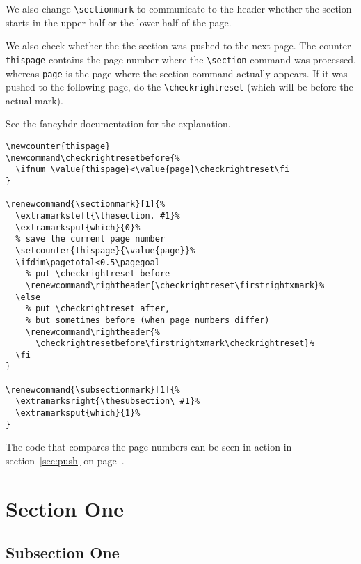 \documentclass{article}
\newcommand\rightheader{\firstrightxmark}
\newcommand\checkrightreset{%
  \ifextramarksmissing{left}
  {}
  {%
    \ifnum\extramarkslast{which}=0
      \extramarksreset{right}%
    \fi
  }%
}
\newcounter{thispage}
\newcommand\checkrightresetbefore{%
  \ifnum \value{thispage}<\value{page}\checkrightreset\fi
}
\renewcommand{\sectionmark}[1]{%
  \extramarksleft{\thesection. #1}%
  \extramarksput{which}{0}%
  \setcounter{thispage}{\value{page}}%
  \ifdim\pagetotal<0.5\pagegoal
    \renewcommand\rightheader{\checkrightreset\firstrightxmark}%
  \else
    \renewcommand\rightheader{%
      \checkrightresetbefore\firstrightxmark\checkrightreset}%
  \fi
}
\renewcommand{\subsectionmark}[1]{%
  \extramarksright{\thesubsection\ #1}%
  \extramarksput{which}{1}%
}
\begin{document}
\noindent
\begin{boxedminipage}{\textwidth}
We also change \verb|\sectionmark| to communicate to the header whether the section starts in the upper half or the lower half of the page.

We also check whether the the section was pushed to the next page.
The counter \texttt{thispage} contains the page number where the \verb|\section|
command was processed, whereas \texttt{page} is the page where the section
command actually appears. If it was pushed to the following page, do
the \verb|\checkrightreset| (which will be before the actual mark).

See the \textsf{fancyhdr} documentation for the explanation.

\begin{verbatim}
\newcounter{thispage}
\newcommand\checkrightresetbefore{% 
  \ifnum \value{thispage}<\value{page}\checkrightreset\fi
}

\renewcommand{\sectionmark}[1]{%
  \extramarksleft{\thesection. #1}%
  \extramarksput{which}{0}%
  % save the current page number
  \setcounter{thispage}{\value{page}}%
  \ifdim\pagetotal<0.5\pagegoal
    % put \checkrightreset before
    \renewcommand\rightheader{\checkrightreset\firstrightxmark}%
  \else
    % put \checkrightreset after,
    % but sometimes before (when page numbers differ)
    \renewcommand\rightheader{%
      \checkrightresetbefore\firstrightxmark\checkrightreset}%
  \fi
}

\renewcommand{\subsectionmark}[1]{%
  \extramarksright{\thesubsection\ #1}%
  \extramarksput{which}{1}%
}
\end{verbatim}

The code that compares the page numbers can be seen in action in section~\ref{sec:push} on page~\pageref{sec:push}.

\end{boxedminipage}

\newpage
\pagestyle{fancy}

\section{Section One}

\subsection{Subsection One}
\end{document}
